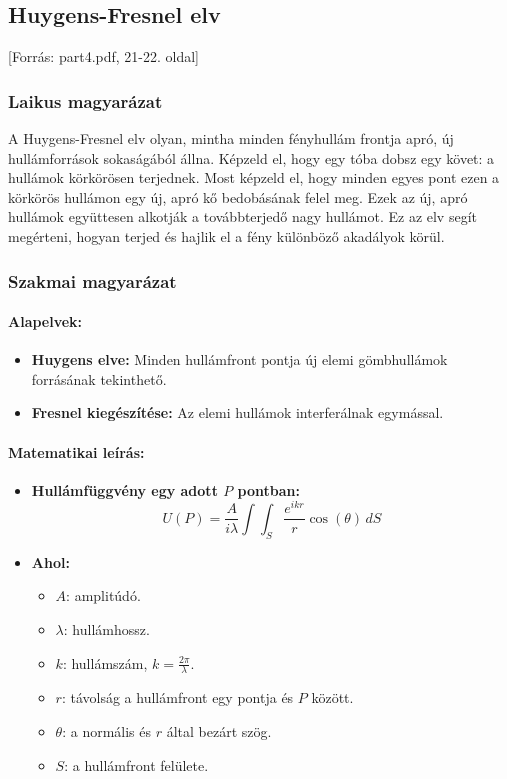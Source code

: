 \documentclass[a4paper,12pt]{article}
\begin{document}
\subsection{Huygens-Fresnel elv} [Forrás: part4.pdf, 21-22. oldal]

\subsubsection{Laikus magyarázat} 
A Huygens-Fresnel elv olyan, mintha minden fényhullám frontja apró, új hullámforrások sokaságából állna. Képzeld el, hogy egy tóba dobsz egy követ: a hullámok körkörösen terjednek. Most képzeld el, hogy minden egyes pont ezen a körkörös hullámon egy új, apró kő bedobásának felel meg. Ezek az új, apró hullámok együttesen alkotják a továbbterjedő nagy hullámot. Ez az elv segít megérteni, hogyan terjed és hajlik el a fény különböző akadályok körül.

\subsubsection{Szakmai magyarázat}

\paragraph{Alapelvek:} 
\begin{itemize}
    \item \textbf{Huygens elve:} Minden hullámfront pontja új elemi gömbhullámok forrásának tekinthető.
    \item \textbf{Fresnel kiegészítése:} Az elemi hullámok interferálnak egymással.
\end{itemize}

\paragraph{Matematikai leírás:} 
\begin{itemize}
    \item \textbf{Hullámfüggvény egy adott \( P \) pontban:}
    \[
    U(P) = \frac{A}{i\lambda} \int\int_S \frac{e^{ikr}}{r} \cos(\theta) \, dS
    \]
    \item \textbf{Ahol:}
    \begin{itemize}
        \item \( A \): amplitúdó.
        \item \( \lambda \): hullámhossz.
        \item \( k \): hullámszám, \( k = \frac{2\pi}{\lambda} \).
        \item \( r \): távolság a hullámfront egy pontja és \( P \) között.
        \item \( \theta \): a normális és \( r \) által bezárt szög.
        \item \( S \): a hullámfront felülete.
    \end{itemize}
\end{itemize}
\end{document}
